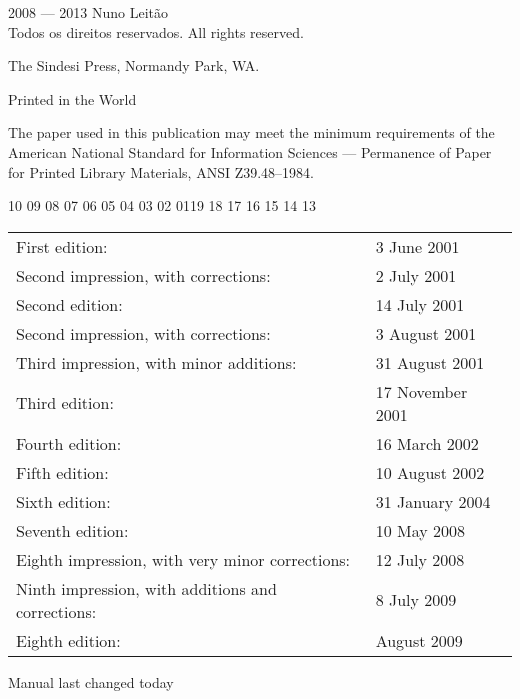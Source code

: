 \documentclass[a4paper,11pt,openany]{memoir}
\newcommand{\PWnote}[2]{}
\begin{document}
\PWnote{2009/06/26}{Updated the copyright page for 9th impression}
\begingroup
\footnotesize
\setlength{\parindent}{0pt}
\setlength{\parskip}{\baselineskip}
\textcopyright{} 2008 --- 2013 Nuno Leitão \\
Todos os direitos reservados.
All rights reserved.

The Sindesi Press, Normandy Park, WA.

Printed in the World 

The paper used in this publication may meet the minimum requirements
of the American National Standard for Information 
Sciences --- Permanence of Paper for Printed Library Materials, 
ANSI Z39.48--1984.

\PWnote{2009/07/08}{Changed manual date to 8 July 2009}
\begin{center}
10 09 08 07 06 05 04 03 02 01\hspace{2em}19 18 17 16 15 14 13
\end{center}
\begin{center}
\begin{tabular}{ll}
First edition:                        & 3 June 2001 \\
Second impression, with corrections:    & 2 July 2001 \\
Second edition:                       & 14 July 2001 \\
Second impression, with corrections:    & 3 August 2001 \\
Third impression, with minor additions: & 31 August 2001 \\
Third edition:                        & 17 November 2001 \\
Fourth edition:                       & 16 March 2002 \\
Fifth edition:                        & 10 August 2002 \\
Sixth edition:                        & 31 January 2004 \\
Seventh edition:                       & 10 May 2008 \\
Eighth impression, with very minor corrections: & 12 July 2008 \\
Ninth impression, with additions and corrections: & 8 July 2009 \\
Eighth edition:                        & August 2009 \\
\end{tabular}
\end{center}
Manual last changed today%
\end{document}
